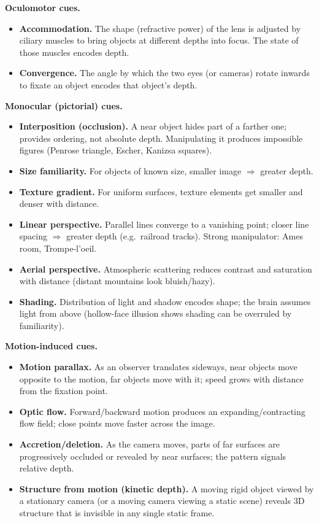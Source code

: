 \textbf{Oculomotor cues.}
\begin{itemize}
  \item \textbf{Accommodation.} The shape (refractive power) of the lens is adjusted by ciliary muscles to bring objects at different depths into focus. The state of those muscles encodes depth.
  \item \textbf{Convergence.} The angle by which the two eyes (or cameras) rotate inwards to fixate an object encodes that object's depth.
\end{itemize}

\textbf{Monocular (pictorial) cues.}
\begin{itemize}
  \item \textbf{Interposition (occlusion).} A near object hides part of a farther one; provides ordering, not absolute depth. Manipulating it produces impossible figures (Penrose triangle, Escher, Kanizsa squares).
  \item \textbf{Size familiarity.} For objects of known size, smaller image $\Rightarrow$ greater depth.
  \item \textbf{Texture gradient.} For uniform surfaces, texture elements get smaller and denser with distance.
  \item \textbf{Linear perspective.} Parallel lines converge to a vanishing point; closer line spacing $\Rightarrow$ greater depth (e.g.\ railroad tracks). Strong manipulator: Ames room, Trompe-l'oeil.
  \item \textbf{Aerial perspective.} Atmospheric scattering reduces contrast and saturation with distance (distant mountains look bluish/hazy).
  \item \textbf{Shading.} Distribution of light and shadow encodes shape; the brain assumes light from above (hollow-face illusion shows shading can be overruled by familiarity).
\end{itemize}

\textbf{Motion-induced cues.}
\begin{itemize}
  \item \textbf{Motion parallax.} As an observer translates sideways, near objects move opposite to the motion, far objects move with it; speed grows with distance from the fixation point.
  \item \textbf{Optic flow.} Forward/backward motion produces an expanding/contracting flow field; close points move faster across the image.
  \item \textbf{Accretion/deletion.} As the camera moves, parts of far surfaces are progressively occluded or revealed by near surfaces; the pattern signals relative depth.
  \item \textbf{Structure from motion (kinetic depth).} A moving rigid object viewed by a stationary camera (or a moving camera viewing a static scene) reveals 3D structure that is invisible in any single static frame.
\end{itemize}

